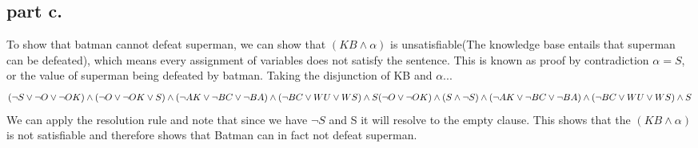\subsection{part c.}
To show that batman cannot defeat superman, we can show that $(KB \land \alpha)$ is unsatisfiable(The knowledge base entails that superman can be defeated),
which means every assignment of variables does not satisfy the sentence. This is known as proof by contradiction ${\alpha} = S$, or the value of superman
being defeated by batman.
\newpage
Taking the disjunction of KB and $\alpha... $\\
\[
(\neg{S} \lor \neg{O} \lor \neg{OK})  \land (\neg{O} \lor \neg{OK} \lor S)  \land (\neg AK \lor \neg BC \lor \neg BA) \land (\neg BC \lor WU \lor WS) \land S \\
(\neg{O} \lor \neg{OK}) \land (S \land \neg{S})  \land (\neg AK \lor \neg BC \lor \neg BA) \land (\neg BC \lor WU \lor WS) \land S \\
\]
We can apply the resolution rule and note that since we have $\neg{S}$ and S it will resolve to the empty clause. This shows
that the $(KB \land \alpha)$ is not satisfiable and therefore shows that Batman can in fact not defeat superman.
